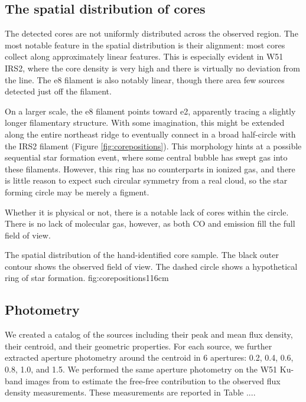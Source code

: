 \documentclass{aa}
\begin{document}
\subsection{The spatial distribution of cores}
The detected cores are not uniformly distributed across the observed region.
The most notable feature in the spatial distribution is their alignment: most cores
collect along approximately linear features.  This is especially evident
in W51 IRS2, where the core density is very high and there is virtually no
deviation from the line.  The e8 filament is also notably linear, though there
area few sources detected just off the filament. 

On a larger scale, the e8 filament points toward e2, apparently tracing a
slightly longer filamentary structure.  With some imagination, this might be
extended along the entire northeast ridge to eventually connect in a broad
half-circle with the IRS2 filament (Figure \ref{fig:corepositions}).  This
morphology hints at a possible sequential star formation event, where some
central bubble has swept gas into these filaments.  However, this ring has no
counterparts in ionized gas, and there is little reason to expect such circular
symmetry from a real cloud, so the star forming circle may be merely a figment.

Whether it is physical or not, there is a notable lack of cores within the
circle.  There is no lack of molecular gas, however, as both CO and \formaldehyde
emission fill the full field of view.

{The spatial distribution of the hand-identified core sample.
The black outer contour shows the observed field of view.
The dashed circle shows a hypothetical ring of star formation.
}{fig:corepositions}{1}{16cm}

\subsection{Photometry}
\label{sec:photometry}
We created a catalog of the sources including their peak and mean
flux density, their centroid, and their geometric properties.  For each source,
we further extracted aperture photometry around the centroid in 6 apertures:
0.2, 0.4, 0.6, 0.8, 1.0, and 1.5\arcsec.  We performed the same aperture
photometry on the W51 Ku-band images from \citet{Ginsburg2016a} to estimate
the free-free contribution to the observed flux density measurements.  These
measurements are reported in Table {...}.
\end{document}
